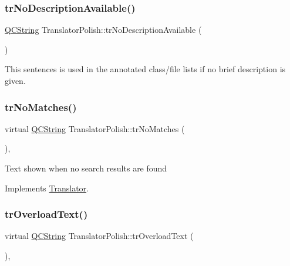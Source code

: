 \subsubsection{\texorpdfstring{trNoDescriptionAvailable()}{trNoDescriptionAvailable()}}
{\footnotesize\ttfamily \mbox{\hyperlink{class_q_c_string}{Q\+C\+String}} Translator\+Polish\+::tr\+No\+Description\+Available (\begin{DoxyParamCaption}{ }\end{DoxyParamCaption})\hspace{0.3cm}{\ttfamily [inline]}}

This sentences is used in the annotated class/file lists if no brief description is given. \mbox{\label{class_translator_polish_a94f98c5be6693dd263dc0ff95a042dfa}} 
\subsubsection{\texorpdfstring{trNoMatches()}{trNoMatches()}}
{\footnotesize\ttfamily virtual \mbox{\hyperlink{class_q_c_string}{Q\+C\+String}} Translator\+Polish\+::tr\+No\+Matches (\begin{DoxyParamCaption}{ }\end{DoxyParamCaption})\hspace{0.3cm}{\ttfamily [inline]}, {\ttfamily [virtual]}}

Text shown when no search results are found 

Implements \mbox{\hyperlink{class_translator}{Translator}}.

\mbox{\label{class_translator_polish_aa85a82b3a60d234fcb2c1b611a190a75}} 
\subsubsection{\texorpdfstring{trOverloadText()}{trOverloadText()}}
{\footnotesize\ttfamily virtual \mbox{\hyperlink{class_q_c_string}{Q\+C\+String}} Translator\+Polish\+::tr\+Overload\+Text (\begin{DoxyParamCaption}{ }\end{DoxyParamCaption})\hspace{0.3cm}{\ttfamily [inline]}, {\ttfamily [virtual]}}

